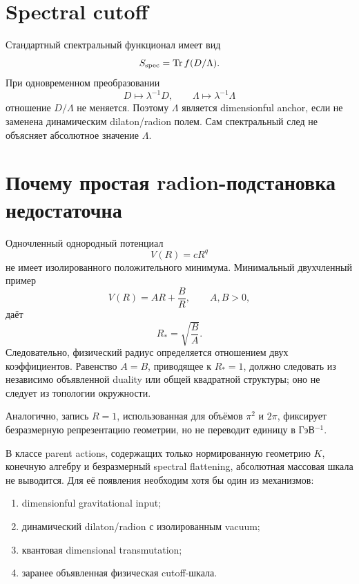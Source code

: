 \section{Spectral cutoff}

Стандартный спектральный функционал имеет вид
\begin{equation}
 S_{\mathrm{spec}}=\operatorname{Tr} f(D/\Lambda).
\end{equation}
При одновременном преобразовании
\begin{equation}
 D\longmapsto\lambda^{-1}D,
 \qquad
 \Lambda\longmapsto\lambda^{-1}\Lambda
\end{equation}
отношение \(D/\Lambda\) не меняется. Поэтому \(\Lambda\) является
dimensionful anchor, если не заменена динамическим dilaton/radion полем.
Сам спектральный след не объясняет абсолютное значение \(\Lambda\).

\section{Почему простая radion-подстановка недостаточна}

Одночленный однородный потенциал
\begin{equation}
 V(R)=cR^q
\end{equation}
не имеет изолированного положительного минимума. Минимальный двухчленный
пример
\begin{equation}
 V(R)=AR+\frac{B}{R},
 \qquad A,B>0,
\end{equation}
даёт
\begin{equation}
 R_*=\sqrt{\frac BA}.
\end{equation}
Следовательно, физический радиус определяется отношением двух
коэффициентов. Равенство \(A=B\), приводящее к \(R_*=1\), должно следовать
из независимо объявленной duality или общей квадратной структуры; оно не
следует из топологии окружности.

Аналогично, запись \(R=1\), использованная для объёмов
\(\pi^2\) и \(2\pi\), фиксирует безразмерную репрезентацию геометрии, но не
переводит единицу в ГэВ\(^{-1}\).

\begin{nogocriterion}
В классе parent actions, содержащих только нормированную геометрию \(K\),
конечную алгебру и безразмерный spectral flattening, абсолютная массовая
шкала не выводится. Для её появления необходим хотя бы один из механизмов:
\begin{enumerate}
 \item dimensionful gravitational input;
 \item динамический dilaton/radion с изолированным vacuum;
 \item квантовая dimensional transmutation;
 \item заранее объявленная физическая cutoff-шкала.
\end{enumerate}
\end{nogocriterion}

